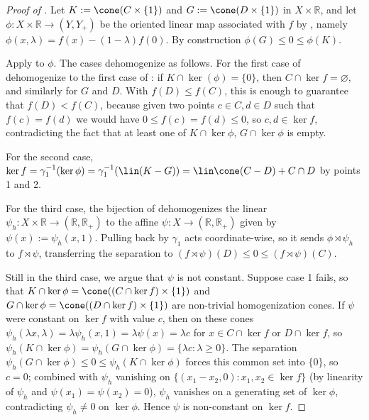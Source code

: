 \documentclass{article}
\theoremstyle{plain}
\theoremstyle{definition}
\theoremstyle{remark}
\begin{document}
\begin{proof}[\hypertarget{loc:alternatives_for_a_separating_affine_oriented_map.proof}{}Proof of ]

Let $K := \cone(C \times \{1\})$ and $G := \cone(D \times \{1\})$ in $X \times \mathbb{R}$, and let $\phi:X \times \mathbb{R} \to (Y, Y_+)$ be the oriented linear map associated with $f$ by , namely $\phi(x, \lambda) = f(x) - (1-\lambda)f(0)$. By construction $\phi(G) \le 0 \le \phi(K)$.

Apply  to $\phi$. The cases dehomogenize as follows.
For the first case of 
dehomogenize to the first case of : if $K \cap \ker(\phi) = \{0\}$, then $C \cap \ker f=\varnothing$, and similarly for $G$ and $D$. With $f(D) \leq f(C)$, this is enough to guarantee that $f(D) < f(C)$, because given two points $c  \in C, d  \in D$
such that $f(c)=f(d)$ we would have $0 \leq f(c) =f(d) \leq 0$, so $c,d  \in \ker f$, contradicting the fact that at least one of $K \cap \ker \phi$, $G \cap \ker \phi$ is empty.

For the second case, $\ker f = \gamma_1^{-1}(\ker \phi) = \gamma_1^{-1}(\lin(K-G)) = \lin\cone(C-D) + C \cap D$ by  points 1 and 2.

For the third case, the bijection of  dehomogenizes the linear $\psi_h:X \times \mathbb{R} \to (\mathbb{R}, \mathbb{R}_+)$ to the affine $\psi:X \to (\mathbb{R}, \mathbb{R}_+)$ given by $\psi(x) := \psi_h(x, 1)$. Pulling back by $\gamma_1$ acts coordinate-wise, so it sends $\phi \rtimes \psi_h$ to $f \rtimes \psi$, transferring the separation to $(f \rtimes \psi)(D) \le 0 \le (f \rtimes \psi)(C)$.

Still in the third case, we argue that $\psi$ is not constant. Suppose case 1 fails, so that $K \cap \ker\phi = \cone((C \cap \ker f) \times \{1\})$ and $G \cap \ker\phi = \cone((D \cap \ker f) \times \{1\})$ are non-trivial homogenization cones. If $\psi$ were constant on $\ker f$ with value $c$, then on these cones $\psi_h(\lambda x, \lambda) = \lambda \psi_h(x, 1) = \lambda \psi(x) = \lambda c$ for $x \in C \cap \ker f$ or $D \cap \ker f$, so $\psi_h(K \cap \ker\phi) = \psi_h(G \cap \ker\phi) = \{\lambda c : \lambda \ge 0\}$. The separation $\psi_h(G \cap \ker\phi) \le 0 \le \psi_h(K \cap \ker\phi)$ forces this common set into $\{0\}$, so $c = 0$; combined with $\psi_h$ vanishing on $\{(x_1 - x_2, 0) : x_1, x_2 \in \ker f\}$ (by linearity of $\psi_h$ and $\psi(x_1) = \psi(x_2) = 0$), $\psi_h$ vanishes on a generating set of $\ker\phi$, contradicting $\psi_h \neq 0$ on $\ker\phi$. Hence $\psi$ is non-constant on $\ker f$.
\end{proof}
\end{document}
